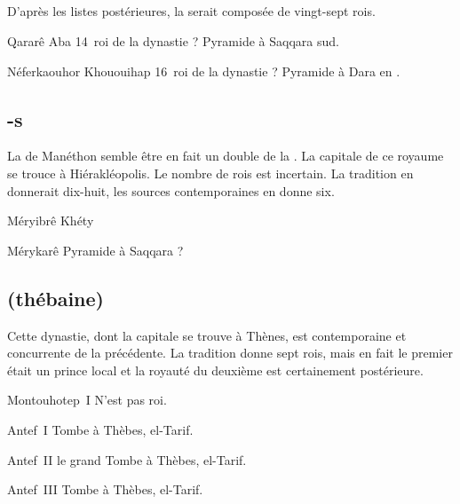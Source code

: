 \subsection{\texorpdfstring{}{VIIIe dynastie}}

D'après les listes postérieures, la  serait composée de 
vingt-sept rois.

\begin{listerois}
  \item [Qararê Aba] 14\ieme~roi de la dynastie ? 
        Pyramide à Saqqara sud. \\
  \item [Néferkaouhor Khououihap] 16\ieme~roi de la dynastie ? 
        Pyramide à Dara en \ME.
\end{listerois}

\subsection{\texorpdfstring{\ieme-s}{IXe-Xe dynasties}}

La  de Manéthon semble être en fait un double de la 
\ieme. 
La capitale de ce royaume se trouce à Hiérakléopolis. Le nombre de 
rois est incertain. La tradition en donnerait dix-huit, les sources
contemporaines en donne six.

\begin{listerois}
  \item [Méryibrê Khéty]
  \item [Mérykarê] Pyramide à Saqqara ?
\end{listerois}

\subsection{\texorpdfstring{}{XIe dynastie} (thébaine)}

Cette dynastie, dont la capitale se trouve à Thènes, est contemporaine 
et concurrente de la précédente. La tradition donne sept rois, mais en 
fait le premier était un prince local et la royauté du deuxième est 
certainement postérieure.

\noi{}

\begin{listerois}
  \item [Montouhotep~I] N'est pas roi.
  \item [Antef~I] Tombe à Thèbes, el-Tarif.
  \item [Antef~II le grand] Tombe à Thèbes, el-Tarif. \\
  \item [Antef~III] Tombe à Thèbes, el-Tarif.
\end{listerois}

